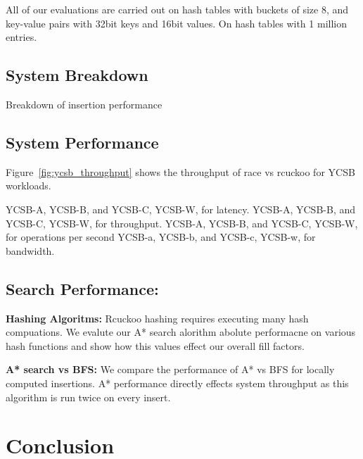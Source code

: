 All of our evaluations are carried out on hash tables with
buckets of size 8, and key-value pairs with 32bit keys and
16bit values. On hash tables with 1 million entries.

\subsection{System Breakdown}

Breakdown of insertion performance 

\subsection{System Performance}


Figure~\ref{fig:ycsb_throughput} shows the throughput of race vs rcuckoo for YCSB workloads.

YCSB-A, YCSB-B, and YCSB-C, YCSB-W, for latency.
YCSB-A, YCSB-B, and YCSB-C, YCSB-W, for throughput.
YCSB-A, YCSB-B, and YCSB-C, YCSB-W, for operations per second
YCSB-a, YCSB-b, and YCSB-c, YCSB-w, for bandwidth.



\subsection{Search Performance:}

\textbf{Hashing Algoritms:} Rcuckoo hashing requires
executing many hash compuations. We evalute our A* search
alorithm abolute performacne on various hash functions and
show how this values effect our overall fill factors.

\textbf{A* search vs BFS:} We compare the performance of A*
vs BFS for locally computed insertions. A* performance
directly effects system throughput as this algorithm is run
twice on every insert.


\section{Conclusion}
\label{sec:conclusion}
